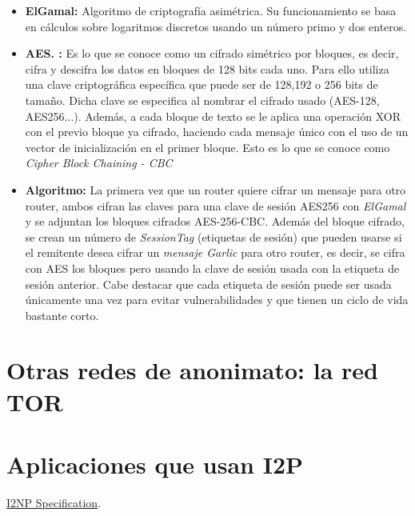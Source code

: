 \begin{itemize}

\item \textbf{ElGamal:}
Algoritmo de criptografía asimétrica. Su funcionamiento se basa en cálculos sobre logaritmos discretos usando un número primo y dos enteros.   


\item \textbf{AES. :}
Es lo que se conoce como un cifrado simétrico por bloques, es decir, cifra y descifra los datos en bloques de 128 bits cada uno. Para ello utiliza una clave criptográfica específica que puede ser de 128,192 o 256 bits de tamaño. Dicha clave se especifica al nombrar el cifrado usado (AES-128, AES256...). Además, a cada bloque de texto se le aplica una operación XOR con el previo bloque ya cifrado, haciendo cada mensaje único con el uso de un vector de inicialización en el primer bloque. Esto es lo que se conoce como \textit{Cipher Block Chaining - CBC} 


\item \textbf{Algoritmo:} La primera vez que un router quiere cifrar un mensaje para otro router, ambos cifran las claves para una clave de sesión AES256 con \textit{ElGamal} y se adjuntan los bloques cifrados  AES-256-CBC.
Además del bloque cifrado, se crean un número de \textit{SessionTag} (etiquetas de sesión) que pueden usarse si el remitente desea cifrar un \textit{mensaje Garlic} para otro router, es decir, se cifra con AES los bloques pero usando la clave de sesión usada con la etiqueta de sesión anterior. 
Cabe destacar que cada etiqueta de sesión puede ser usada únicamente una vez para evitar vulnerabilidades y que tienen un ciclo de vida bastante corto.


\end{itemize}




    \section{Otras redes de anonimato: la red TOR}
    
    
    
    
    \section{Aplicaciones que usan I2P}
    
    
   
\begin{thebibliography}{9}


   \href{https://geti2p.net/spec/i2np}{I2NP Specification}.
   
  
  
  

\end{thebibliography}

